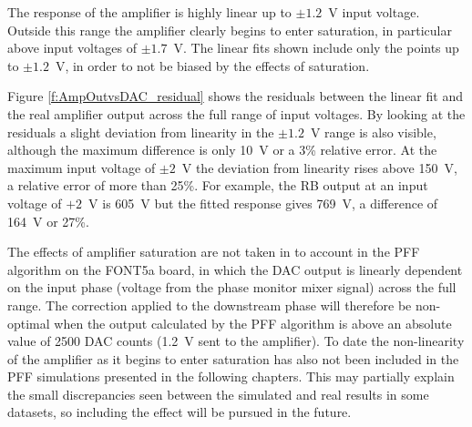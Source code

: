 The response of the amplifier is highly linear up to \(\pm1.2\)~V input voltage. Outside this range the amplifier clearly begins to enter saturation, in particular above input voltages of \(\pm1.7\)~V. The linear fits shown include only the points up to \(\pm1.2\)~V, in order to not be biased by the effects of saturation.

Figure \ref{f:AmpOutvsDAC_residual} shows the residuals between the linear fit and the real amplifier output across the full range of input voltages. By looking at the residuals a slight deviation from linearity in the \(\pm1.2\)~V range is also visible, although the maximum difference is only 10~V or a 3\% relative error. At the maximum input voltage of \(\pm2\)~V the deviation from linearity rises above 150~V,  a relative error of more than 25\%. For example, the RB output at an input voltage of \(+2\)~V is 605~V but the fitted response gives 769~V, a difference of 164~V or 27\%.

The effects of amplifier saturation are not taken in to account in the PFF algorithm on the FONT5a board, in which the DAC output is linearly dependent on the input phase (voltage from the phase monitor mixer signal) across the full range. The correction applied to the downstream phase will therefore be non-optimal when the output calculated by the PFF algorithm is above an absolute value of 2500 DAC counts (1.2~V sent to the amplifier). To date the non-linearity of the amplifier as it begins to enter saturation has also not been included in the PFF simulations presented in the following chapters. This may partially explain the small discrepancies seen between the simulated and real results in some datasets, so including the effect will be pursued in the future. 

